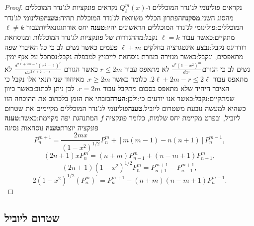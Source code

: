 \documentclass{tstextbook}
\begin{document}
\begin{proof}
נקראים פולינומי לג'נדר המוכללים ו-\(Q^{m}_{\ell}(x)\) נקראים פונקציות לג'נדר המוכללים מהסוג השני.\textbf{מסקנה}הפתרון הכללי משוואת לג'נדר המוכללת תהיה:\textbf{טענה}פולינומי לג'נדר המוכללים:פולינומי לג'נדר המוכללים הראשונים יהיו:\textbf{טענה} יחס אורתוגונאליותעבור \(\ell \neq k\) מתקיים:כאשר עבור \(\ell=k\) נקבל:מההגדרות של פונקציות לג'נדר המוכללות ומנוסחאת רודריגס נקבל:נבצע אינטגרציה בחלקים \(\ell+m\) פעמים כאשר נשים לב כי כל האיברי שפה מתאפסים, ונקבל:כאשר מגזירה בעזרת נוסחאת לייבניץ למכפלה נקבל:נסתכל על אגף ימין. נשים לב כי הגורם\(\frac{d^{r}(1-x^{2})^{m}}{d x^{r}}\) לא מתאפס עבור \(r\leq 2m\) כאשר הגורם \(\frac{d^{2\ell+2m-r}(x^{2}-1)^{\ell}}{d x^{2\ell+2m-r}}\) לא מתאפס עבור \(2\ell+2m-r\leq 2\ell\). כלומר כאשר \(r\geq 2m\). מאיחוד שני תנאי אלו נקבל כי האיבר היחיד שלא מתאפס בסכום מתקבל עבור \(r=2m\). לכן ניתן לכתוב:כאשר כיוון שמתקיים:נקבל:כאשר אנו יודעים כי:ולכן:\textbf{הערה}בזבתי את הזמן בלכתוב את ההוכחה הזו כשהיא למעשה נובעת משטרום ליוביל.\textbf{טענה}פולינומי לג'נדר המוכללים מקיימים את שטרום ליוביל, ובפרט מקיימת יחס שלמות, כלומר פונקציה \(f\) המתנהגת יפה מקיימת:כאשר:\textbf{טענה} פונקציה יוצרת\textbf{טענה} נוסחאות נסיגה
$$P_{n}^{m+1}=\frac{2m x}{(1-x^{2})^{1/2}}P_{n}^{m}+[m(m-1)-n(n+1)]P_{n}^{m-1},$$$$(2n+1)xP_{n}^{m}=(n+m)P_{n-1}^{m}+(n-m+1)P_{n+1}^{m},$$$$(2n+1)(1-x^{2})^{1/2}P_{n}^{m}=P_{n+1}^{m+1}-P_{n-1}^{m+1},$$$$2(1-x^{2})^{1/2}(P_{n}^{m})^{\prime}=P_{n}^{m+1}-(n+m)(n-m+1)P_{n}^{m-1}.$$

\end{proof}
\subsection{שטרום ליוביל}
\end{document}
